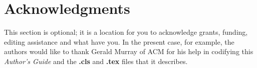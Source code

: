 \documentclass{sig-alternate-05-2015}
\begin{document}
\section{Acknowledgments}
This section is optional; it is a location for you
to acknowledge grants, funding, editing assistance and
what have you.  In the present case, for example, the
authors would like to thank Gerald Murray of ACM for
his help in codifying this \textit{Author's Guide}
and the \textbf{.cls} and \textbf{.tex} files that it describes.

%

  
\end{document}
